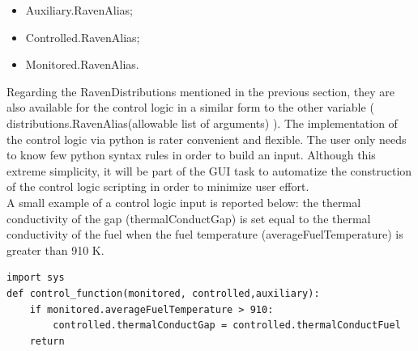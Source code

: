 \documentclass{mc2013}
\begin{document}
\begin{itemize}
  \item Auxiliary.RavenAlias;
  \item Controlled.RavenAlias;
  \item Monitored.RavenAlias.
\end{itemize}
Regarding the RavenDistributions mentioned in the previous section, they are also available for the control logic in a similar form to the other variable ( distributions.RavenAlias(allowable list of arguments) ).
The implementation of the control logic via python is rater convenient and flexible. The user only needs to know few python syntax rules in order to build an input. Although this extreme simplicity, it will be part of the GUI task to automatize the construction of the control logic scripting in order to minimize user effort. 
\\ A small example of a control logic input is reported below:
the thermal conductivity of the gap (thermalConductGap) is set equal to the thermal conductivity of the fuel when the fuel temperature (averageFuelTemperature) is greater than 910 K.
\lstset{
   language=Python,
   showstringspaces=false,
   formfeed=\newpage,
   tabsize=4,
   commentstyle=\itshape
}
\begin{lstlisting}
import sys
def control_function(monitored, controlled,auxiliary):
    if monitored.averageFuelTemperature > 910:
        controlled.thermalConductGap = controlled.thermalConductFuel
    return 
\end{lstlisting}

\label{sec:pyhtonCalcDriver}



\label{sec:GUI}
\end{document}
